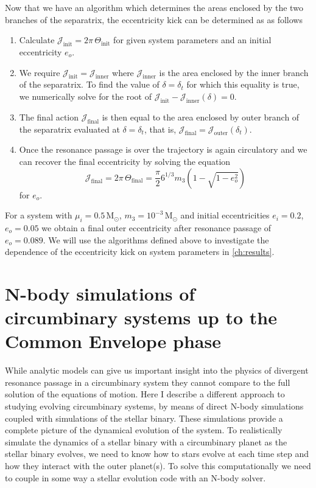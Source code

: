 \documentclass[twoside,openright,titlepage,numbers=noenddot,headinclude,%
                footinclude=true,cleardoublepage=empty,abstractoff, 
                BCOR=5mm,paper=a4,fontsize=11pt,%
                american,%
                ]{scrreprt}%
\begin{document}
Now that we have an algorithm which determines the areas enclosed by the two
branches of the separatrix, the eccentricity kick can be determined as
as follows
\begin{enumerate}
    \item Calculate $\mathcal{J}_\text{init}=2\pi\,\Theta_\text{init}$ for given
        system parameters and an initial eccentricity $e_o$.
    \item We require $\mathcal{J}_\text{init}=\mathcal{J}_\text{inner}$ 
        where $\mathcal{J}_\text{inner}$ is the area enclosed by the inner
        branch of the separatrix. To find the value of $\delta=\delta_t$ for
        which this equality is true, we numerically solve for the root of
        $\mathcal{J}_\text{init}-\mathcal{J}_\text{inner}(\delta)=0$.
    \item The final action $\mathcal{J}_\text{final}$ is then equal to
        the area enclosed by outer branch of the separatrix evaluated at
        $\delta=\delta_t$, that is, $\mathcal{J}_\text{final}=
        \mathcal{J}_\text{outer}(\delta_t)$.
    \item Once the resonance passage is over the trajectory is again circulatory
        and we can recover the final eccentricity by solving the equation
        \begin{equation}
            \mathcal{J}_\text{final}=2\pi\,\Theta_\text{final}=
            \frac{\pi}{2} 6^{1/3}m_3\left(1-\sqrt{1-e_o^2}\right)
        \end{equation}
        for $e_o$. 
\end{enumerate}
For a system with $\mu_i=0.5\,\text{M}_\odot$, $m_3=10^{-3}\,\text{M}_\odot$ 
and initial eccentricities $e_i=0.2$, $e_o=0.05$ we obtain a final outer
eccentricity after resonance passage of $e_o=0.089$. We will use the
algorithms defined above to investigate the dependence of the eccentricity
kick on system parameters in \cref{ch:results}.
\chapter{N-body simulations of circumbinary systems up to the Common Envelope phase}
\label{ch:numerical_analysis}
While analytic models can give us important insight into the physics 
of divergent resonance passage in a circumbinary system
they cannot compare to the full solution of the equations of motion.
Here I describe a different approach to studying evolving
circumbinary systems, by means of direct
N-body simulations coupled with simulations of the stellar binary. 
These simulations provide a complete picture of the dynamical evolution
of the system. To realistically simulate the dynamics of a stellar binary
with a circumbinary planet as the stellar binary evolves, we need to know
how to stars evolve at each time step and how they interact with the outer
planet(s). To solve this computationally we need to couple in some way
a stellar evolution code with an N-body solver. 
\end{document}
